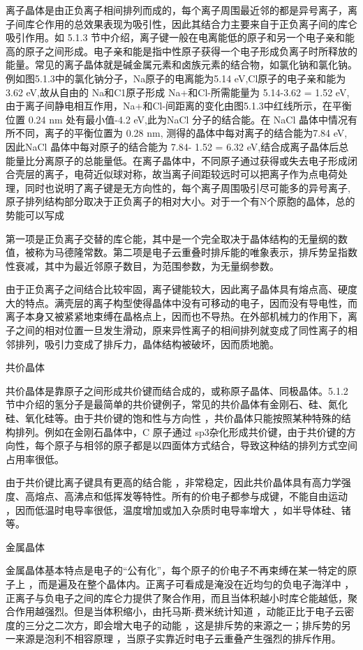 离子晶体是由正负离子相间排列而成的，每个离子周围最近邻的都是异号离子，离子间库仑作用的总效果表现为吸引性，因此其结合力主要来自于正负离子间的库仑吸引作用。如 5.1.3 节中介绍，离子键一般在电离能低的原子和另一个电子亲和能高的原子之间形成。电子亲和能是指中性原子获得一个电子形成负离子时所释放的能量。常见的离子晶体就是碱金属元素和卤族元素的结合物，如氯化钠和氯化钠。例如图5.1.3中的氯化钠分子，Na原子的电离能为5.14 eV,Cl原子的电子亲和能为 3.62 eV,故从自由的 Na和C1原子形成 Na+和Cl-所需能量为 5.14-3.62 = 1.52 eV,由于离子间静电相互作用，Na+和Cl-间距离的变化由图5.1.3中红线所示，在平衡位置 0.24 nm 处有最小值-4.2 eV,此为NaCl 分子的结合能。在 NaCl 晶体中情况有所不同，离子的平衡位置为 0.28 nm, 测得的晶体中每对离子的结合能为7.84 eV, 因此NaCl 晶体中每对原子的结合能为 7.84- 1.52 = 6.32 eV,结合成离子晶体后总能量比分离原子的总能量低。在离子晶体中，不同原子通过获得或失去电子形成闭合壳层的离子，电荷近似球对称，故当离子间距较远时可以把离子作为点电荷处理，同时也说明了离子键是无方向性的，每个离子周围吸引尽可能多的异号离子,原子排列结构部分取决于正负离子的相对大小。对于一个有N个原胞的晶体，总的势能可以写成



第一项是正负离子交替的库仑能，其中是一个完全取决于晶体结构的无量纲的数值，被称为马德隆常数。第二项是电子云重叠时排斥能的唯象表示，排斥势呈指数性衰减，其中为最近邻原子数目，为范围参数，为无量纲参数。

由于正负离子之间结合比较牢固，离子键能较大，因此离子晶体具有熔点高、硬度大的特点。满壳层的离子构型使得晶体中没有可移动的电子，因而没有导电性，而离子本身又被紧紧地束缚在晶格点上，因而也不导热。在外部机械力的作用下，离子之间的相对位置一旦发生滑动，原来异性离子的相间排列就变成了同性离子的相邻排列，吸引力变成了排斥力，晶体结构被破坏，因而质地脆。

共价晶体

共价晶体是靠原子之间形成共价键而结合成的，或称原子晶体、同极晶体。5.1.2 节中介绍的氢分子是最简单的共价键例子，常见的共价晶体有金刚石、硅、氮化硅、氧化硅等。由于共价键的饱和性与方向性 ，共价晶体只能按照某种特殊的结构排列。例如在金刚石晶体中，C 原子通过 sp3杂化形成共价键，由于共价键的方向性，每个原子与相邻的原子都是以四面体方式结合，导致这种结的排列方式空间占用率很低。

由于共价键比离子键具有更高的结合能 ，非常稳定，因此共价晶体具有高力学强度、高熔点、高沸点和低挥发等特性。所有的价电子都参与成键，不能自由运动 ，因而低温时电导率很低，温度增加或加入杂质时电导率增大 ，如半导体硅、锗等。

金属晶体

金属晶体基本特点是电子的“公有化”，每个原子的价电子不再束缚在某一特定的原子上 ，而是遍及在整个晶体内。正离子可看成是淹没在近均匀的负电子海洋中 ，正离子与负电子之间的库仑力提供了聚合作用，而且当体积越小时库仑能越低，聚合作用越强烈。但是当体积缩小，由托马斯-费米统计知道 ，动能正比于电子云密度的三分之二次方，即会增大电子的动能 ，这是排斥势的来源之一；排斥势的另一来源是泡利不相容原理 ，当原子实靠近时电子云重叠产生强烈的排斥作用。

